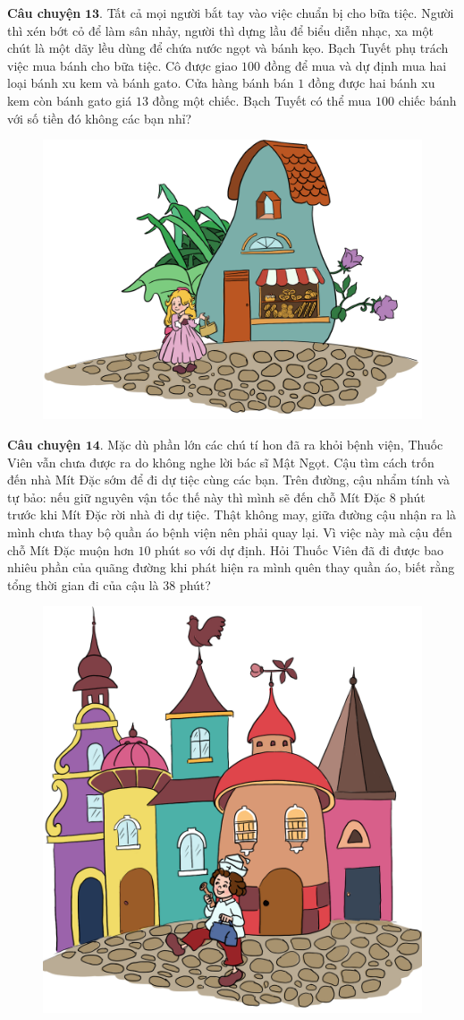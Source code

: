 	\vskip 0.1cm
	\textbf{\color{toancuabi}Câu chuyện} $\pmb{13.}$ Tất cả mọi người bắt tay vào việc chuẩn bị cho bữa tiệc. Người thì xén bớt cỏ để làm sân nhảy, người thì dựng lầu để biểu diễn nhạc, xa một chút là một dãy lều dùng để chứa nước ngọt và bánh kẹo. Bạch Tuyết phụ trách việc mua bánh cho bữa tiệc. Cô được giao $100$ đồng để mua và dự định mua hai loại bánh xu kem và bánh gato. Cửa hàng bánh bán $1$ đồng được hai bánh xu kem còn bánh gato giá $13$ đồng một chiếc. Bạch Tuyết có thể mua $100$ chiếc bánh với số tiền đó không các bạn nhỉ?
		\begin{figure}[H]
		\centering
		\vspace*{-5pt}
		\captionsetup{labelformat= empty, justification=centering}
		\includegraphics[width=0.6\linewidth]{Hinh15_BachTuyet}
		\vspace*{-10pt}
	\end{figure}
	\textbf{\color{toancuabi}Câu chuyện $\pmb{14.}$} Mặc dù phần lớn các chú tí hon đã ra khỏi bệnh viện, Thuốc Viên vẫn chưa được ra do không nghe lời bác sĩ Mật Ngọt. Cậu tìm cách trốn đến nhà Mít Đặc sớm để đi dự tiệc cùng các bạn. Trên đường, cậu nhẩm tính và tự bảo: nếu giữ nguyên vận tốc thế này thì mình sẽ đến chỗ Mít Đặc $8$ phút trước khi Mít Đặc rời nhà đi dự tiệc. Thật không may, giữa đường cậu nhận ra là mình chưa thay bộ quần áo bệnh viện nên phải quay lại. Vì việc này mà cậu đến chỗ Mít Đặc muộn hơn $10$ phút so với dự định. Hỏi Thuốc Viên đã đi được bao nhiêu phần của quãng đường khi phát hiện ra mình quên thay quần áo, biết rằng tổng thời gian đi của cậu là $38$ phút?
	\begin{figure}[H]
		\centering
		\vspace*{-5pt}
		\captionsetup{labelformat= empty, justification=centering}
		\includegraphics[width=0.5\linewidth]{Hinh16_ThuocNuoc}
		\vspace*{-10pt}
	\end{figure}	
